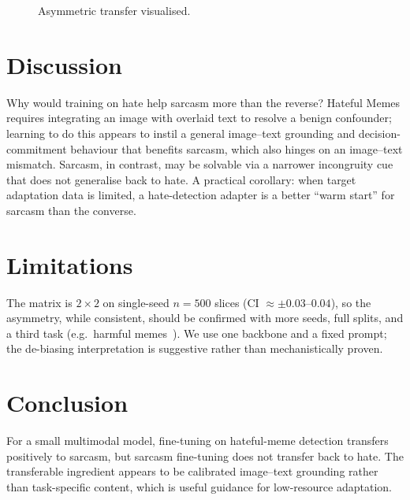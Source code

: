\documentclass[sigconf,nonacm]{acmart}
\begin{document}
\begin{figure}[t]
\centering
{}
\caption{Asymmetric transfer visualised.}
\label{fig:bars}
\end{figure}

\section{Discussion}
Why would training on hate help sarcasm more than the reverse? Hateful Memes requires
integrating an image with overlaid text to resolve a benign confounder; learning to do
this appears to instil a general image--text grounding and decision-commitment behaviour
that benefits sarcasm, which also hinges on an image--text mismatch. Sarcasm, in
contrast, may be solvable via a narrower incongruity cue that does not generalise back to
hate. A practical corollary: when target adaptation data is limited, a hate-detection
adapter is a better ``warm start'' for sarcasm than the converse.

\section{Limitations}
The matrix is $2\times2$ on single-seed $n{=}500$ slices (CI $\approx\pm0.03$--$0.04$),
so the asymmetry, while consistent, should be confirmed with more seeds, full splits, and
a third task (e.g.\ harmful memes~\cite{pramanick2021harmeme}). We use one backbone and a
fixed prompt; the de-biasing interpretation is suggestive rather than mechanistically
proven.

\section{Conclusion}
For a small multimodal model, fine-tuning on hateful-meme detection transfers
positively to sarcasm, but sarcasm fine-tuning does not transfer back to hate. The
transferable ingredient appears to be calibrated image--text grounding rather than
task-specific content, which is useful guidance for low-resource adaptation.



\end{document}
